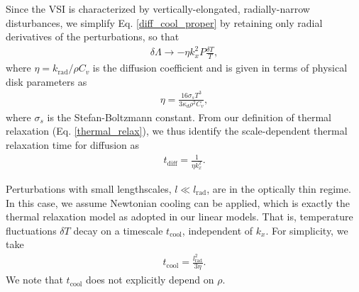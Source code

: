 Since the VSI is characterized by vertically-elongated,
radially-narrow disturbances, we simplify Eq. \ref{diff_cool_proper} 
by retaining only radial derivatives of the perturbations, so that 
\begin{align}\label{diff_cool_approx}
  \delta\Lambda \to %
  -\eta k_x^2 P \frac{\delta T}{T}, %
\end{align}
 where $\eta=k_\mathrm{rad}/\rho C_v$ is
the diffusion coefficient and 
is given in terms of physical disk parameters as 
\begin{align}\label{eta_def}
  \eta = \frac{16\sigma_s T^3}{3\kappa_d\rho^2 C_v}, 
\end{align}
where $\sigma_s$ is the Stefan-Boltzmann constant. From our
definition of thermal relaxation (Eq. \ref{thermal_relax}), 
we thus identify the scale-dependent thermal relaxation
time for diffusion as 
\begin{align}\label{tc_diff_cool} 
  t_\mathrm{diff} = \frac{1}{\eta k_x^2}.%
\end{align}

Perturbations with small lengthscales, $l\ll
l_\mathrm{rad}$, are in the optically thin regime. In this case, we assume 
Newtonian cooling can be applied, which is exactly the thermal 
relaxation model as adopted in our linear models. That is, temperature
fluctuations $\delta T$ decay on a timescale $t_\mathrm{cool}$,
independent of $k_x$. For simplicity, we take  
\begin{align}
  t_\mathrm{cool} = \frac{l_\mathrm{rad}^2}{3\eta}. 
\end{align}
We note that $t_\mathrm{cool}$ does not explicitly depend on $\rho$. 

